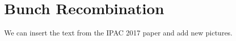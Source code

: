 \section{Bunch Recombination}

We can insert the text from the IPAC 2017  paper and add new pictures.



